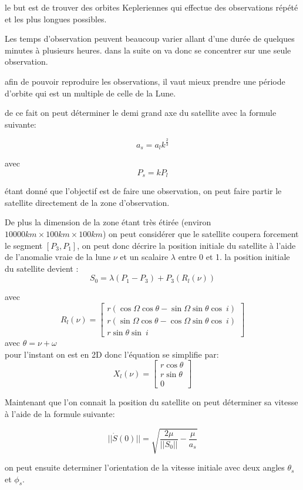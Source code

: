 \documentclass{article} %
\begin{document}
		le but est de trouver des orbites Kepleriennes qui effectue des observations répété et les plus longues possibles.
		
		Les temps d'observation peuvent beaucoup varier allant d'une durée de quelques minutes à plusieurs heures.	dans la suite on va donc se concentrer sur une seule observation.
		
		afin de pouvoir reproduire les observations, il vaut mieux prendre une période d'orbite qui est un multiple de celle de la Lune.
		
		de ce fait on peut déterminer le demi grand axe du satellite avec la formule suivante:
		
		$$
		a_s=a_lk^{\frac{2}{3}}
		$$
		
		avec
		$$
		P_s=kP_l
		$$
		
		étant donné que l'objectif est de faire une observation, on peut faire partir le satellite directement de la zone d'observation.
		
		De plus la dimension de la zone étant très étirée (environ $10000km\times100km\times100km$) on peut considérer que le satellite coupera forcement le segment $[P_3,P_1]$, on peut donc décrire la position initiale du satellite à l'aide de l'anomalie vraie de la lune $\nu$ et un scalaire $\lambda$ entre 0 et 1. la position initiale du satellite devient : 
		$$
		S_0=\lambda(P_1-P_3)+P_3(R_l(\nu))
		$$
		
		avec 
		$$
		R_l(\nu)=\begin{bmatrix}
			r( \cos\Omega \cos\theta -\sin\Omega \sin\theta \cos\ i)\\
			r( \sin\Omega \cos\theta -\cos\Omega \sin\theta \cos\ i)\\
			r\sin\theta \sin\ i\ 
		\end{bmatrix}
		$$
		avec $\theta = \nu+\omega$ \\
		pour l'instant on est en 2D donc l'équation se simplifie par:
		$$
		X_l(\nu)=\begin{bmatrix}
			r \cos\theta \\
			r \sin\theta \\
			0 
		\end{bmatrix}
		$$
		
		Maintenant que l'on connait la position du satellite on peut déterminer sa vitesse à l'aide de la formule suivante:
		
		$$
		||\dot{S}(0)||=\sqrt{\frac{2\mu}{||S_0||}-\frac{\mu}{a_s}}
		$$
		
		on peut ensuite determiner l'orientation de la vitesse initiale avec deux angles $\theta_s$ et $\phi_s$.
		
\end{document}
